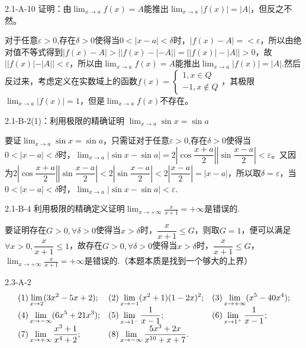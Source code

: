 \begin{example}{2.1-A-10}{}
    证明：由$\displaystyle\lim_{x\to a}f(x)=A$能推出$\displaystyle\lim_{x\to a}|f(x)|=|A|$，但反之不然。
\end{example}
\begin{solution}
    对于任意$\varepsilon>0$,存在$\delta>0$使得当$0<|x-a|<\delta$时，$|f(x)-A|=<\varepsilon$，所以由绝对值不等式得到$\displaystyle|f(x)-A|>||f(x)-|-A||=||f(x)|-|A||>0$，故$||f(x)|-|A||<\varepsilon$，所以由$\displaystyle\lim_{x\to a}f(x)=A$能推出$\displaystyle\lim_{x\to a}|f(x)|=|A|$.然后反过来，考虑定义在实数域上的函数$f(x)=\begin{cases}1,x\in Q\\-1,x\notin Q\end{cases}$，其极限$\displaystyle\lim_{x\to a}|f(x)|=1$，但是$\displaystyle\lim_{x\to a}f(x)$不存在。
\end{solution}
\begin{example}{2.1-B-2(1)：利用极限的精确证明}{}
   $\displaystyle\lim_{x\to a}\sin x=\sin a$
\end{example}
\begin{solution}
    要证$\displaystyle\lim_{x\to a}\sin x=\sin a$，只需证对于任意$\varepsilon>0$,存在$\delta>0$使得当$0<|x-a|<\delta$时，$\displaystyle\lim_{x\to a}|\sin x-\sin a|=2|\cos\dfrac{x+a}{2}||\sin\dfrac{x-a}{2}|<\varepsilon$。又因为$2|\cos\dfrac{x+a}{2}||\sin\dfrac{x-a}{2}|<2|\sin\dfrac{x-a}{2}|<2|\dfrac{x-a}{2}|=|x-a|$，所以取$\delta=\varepsilon$，当$0<|x-a|<\delta$时，$\displaystyle\lim_{x\to a}|\sin x-\sin a|<\varepsilon$.
\end{solution}
\begin{example}{2.1-B-4}{}
    利用极限的精确定义证明$\displaystyle\lim_{x\to +\infty}\frac{x}{x+1}=+\infty$是错误的.
\end{example}
\begin{solution}
    要证明存在$G>0,\forall \delta>0$使得当$x>\delta$时，$\dfrac{x}{x+1}\leq G$，则取$G=1$，便可以满足$\forall x>0,\dfrac{x}{x+1}\leq 1$，故存在$G>0,\forall \delta>0$使得当$x>\delta$时，$\dfrac{x}{x+1}\leq G$，$\displaystyle\lim_{x\to +\infty}\frac{x}{x+1}=+\infty$是错误的.（本题本质是找到一个够大的上界）
\end{solution}
\begin{example}{2.3-A-2}{}
   \vspace{-10pt}\[\begin{array}{l@{\quad}l@{\quad}l}
(1) \displaystyle \lim _{x \rightarrow 2}(3 x^{2}-5 x+2);&
(2) \displaystyle \lim _{x \rightarrow-1}(x^{2}+1)(1-2 x)^{2};&
(3) \displaystyle \lim _{x \rightarrow+\infty}(x^{5}-40 x^{4});\\
(4) \displaystyle \lim _{x \rightarrow-\infty}(6 x^{5}+21 x^{3});&
(5) \displaystyle \lim _{x \rightarrow 1^{-}} \frac{1}{x-1};&
(6) \displaystyle\lim _{x \rightarrow 1^{+}} \frac{1}{x-1};\\
(7) \displaystyle\lim _{x \rightarrow+\infty} \frac{x^{3}+1}{x^{4}+2};&
(8) \displaystyle \lim _{x \rightarrow-\infty} \frac{5 x^{3}+2 x}{x^{10}+x+7}.
    \end{array}\]
\end{example}
